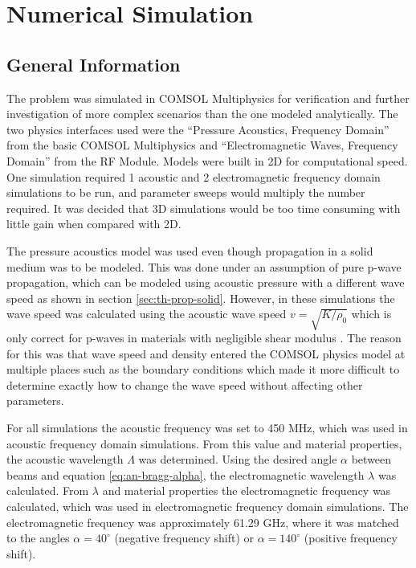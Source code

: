 \documentclass[11pt,twoside]{eitExjobb}
\begin{document}
	
	\chapter{Numerical Simulation} \label{ch:sim}
	
	\section{General Information}
	The problem was simulated in COMSOL Multiphysics for verification and further investigation of more complex scenarios than the one modeled analytically. The two physics interfaces used were the ``Pressure Acoustics, Frequency Domain'' from the basic COMSOL Multiphysics and ``Electromagnetic Waves, Frequency Domain'' from the RF Module. Models were built in 2D for computational speed. One simulation required 1 acoustic and 2 electromagnetic frequency domain simulations to be run, and parameter sweeps would multiply the number required. It was decided that 3D simulations would be too time consuming with little gain when compared with 2D.
	
	The pressure acoustics model was used even though propagation in a solid medium was to be modeled. This was done under an assumption of pure p-wave propagation, which can be modeled using acoustic pressure with a different wave speed as shown in section \ref{sec:th-prop-solid}. However, in these simulations the wave speed was calculated using the acoustic wave speed $v = \sqrt{K/\rho_0}$ which is only correct for p-waves in materials with negligible shear modulus \cite{Schmerr2016}. The reason for this was that wave speed and density entered the COMSOL physics model at multiple places such as the boundary conditions which made it more difficult to determine exactly how to change the wave speed without affecting other parameters. 
	
	For all simulations the acoustic frequency was set to 450 MHz, which was used in acoustic frequency domain simulations. From this value and material properties, the acoustic wavelength $\Lambda$ was determined. Using the desired angle $\alpha$ between beams and equation \eqref{eq:an-bragg-alpha}, the electromagnetic wavelength $\lambda$ was calculated. From $\lambda$ and material properties the electromagnetic frequency was calculated, which was used in electromagnetic frequency domain simulations. The electromagnetic frequency was approximately 61.29 GHz, where it was matched to the angles $\alpha = 40^\circ$ (negative frequency shift) or $\alpha = 140^\circ$ (positive frequency shift).
	
\end{document}

